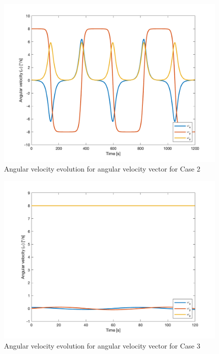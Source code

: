 \begin{figure}[H]
\centering
\includegraphics[scale=0.6]{Images/ps2_problem9_euler_equations_y.png}
\caption{Angular velocity evolution for angular velocity vector for Case 2}
\label{fig:ps2_problem9_euler_equations_y}
\end{figure}

\begin{figure}[H]
\centering
\includegraphics[scale=0.6]{Images/ps2_problem9_euler_equations_z.png}
\caption{Angular velocity evolution for angular velocity vector for Case 3}
\label{fig:ps2_problem9_euler_equations_z}
\end{figure}

